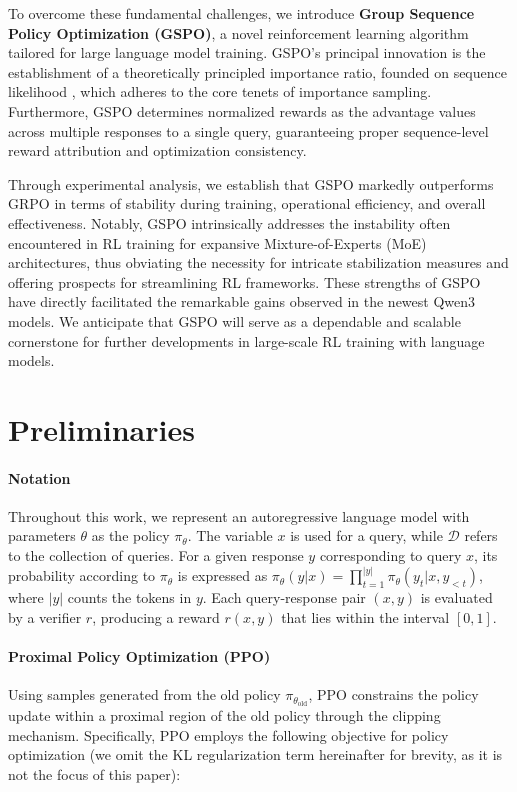 To overcome these fundamental challenges, we introduce \textbf{Group Sequence Policy Optimization (GSPO)}, a novel reinforcement learning algorithm tailored for large language model training. GSPO’s principal innovation is the establishment of a theoretically principled importance ratio, founded on sequence likelihood \citep{click}, which adheres to the core tenets of importance sampling. Furthermore, GSPO determines normalized rewards as the advantage values across multiple responses to a single query, guaranteeing proper sequence-level reward attribution and optimization consistency.

Through experimental analysis, we establish that GSPO markedly outperforms GRPO in terms of stability during training, operational efficiency, and overall effectiveness. Notably, GSPO intrinsically addresses the instability often encountered in RL training for expansive Mixture-of-Experts (MoE) architectures, thus obviating the necessity for intricate stabilization measures and offering prospects for streamlining RL frameworks. These strengths of GSPO have directly facilitated the remarkable gains observed in the newest Qwen3 models. We anticipate that GSPO will serve as a dependable and scalable cornerstone for further developments in large-scale RL training with language models.

\section{Preliminaries}

\paragraph{Notation}
Throughout this work, we represent an autoregressive language model with parameters $\theta$ as the policy $\pi_\theta$. The variable $x$ is used for a query, while $\mathcal{D}$ refers to the collection of queries. For a given response $y$ corresponding to query $x$, its probability according to $\pi_\theta$ is expressed as $\pi_\theta (y | x)=\prod_{t=1}^{|y|} \pi_\theta (y_t | x, y_{<t} )$, where $|y|$ counts the tokens in $y$. Each query-response pair $(x, y)$ is evaluated by a verifier $r$, producing a reward $r(x, y)$ that lies within the interval $[ 0, 1 ]$.

\paragraph{Proximal Policy Optimization (PPO)} Using samples generated from the old policy $\pi_{\theta_\text{old}}$, PPO \citep{ppo} constrains the policy update within a proximal region of the old policy through the clipping mechanism. Specifically, PPO employs the following objective for policy optimization (we omit the KL regularization term hereinafter for brevity, as it is not the focus of this paper):

